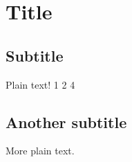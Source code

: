 \documentclass{article}
\begin{document}
\section{Title}

\subsection{Subtitle}

Plain text!
1
2
4

\subsection{Another subtitle}

More plain text.
\end{document}
